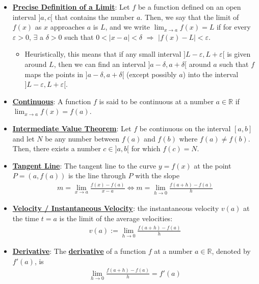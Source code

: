\documentclass[11pt]{article}
\newcommand{\dfn}[1]{\underline{\textbf{#1}}}
\newcommand{\R}[0]{\mathbb{R}}
\begin{document}
\begin{itemize}[noitemsep]
	\item \dfn{Precise Definition of a Limit}: Let $f$ be a function defined on an open interval $]a,c[$ that contains the number $a$. Then, we say that the limit of $f(x)$ as $x$ approaches $a$ is $L$, and we write $\lim_{x \rightarrow a} f(x) = L$ if for every $\varepsilon > 0$, $\exists$ a $\delta > 0$ such that $0 < | x - a | < \delta$ $\Rightarrow$ $|f(x) - L| < \varepsilon$.
	\begin{itemize}[noitemsep]	
		\item Heuristically, this means that if any small interval $] L - \varepsilon, L +  \varepsilon [$ is given around $L$, then we can find an interval $]a - \delta, a + \delta [$ around $a$ such that $f$ maps the points in $]a - \delta, a + \delta [$ (except possibly $a$) into the interval $] L - \varepsilon, L+ \varepsilon[$. 
	\end{itemize}
	\item \dfn{Continuous}: A function $f$ is said to be continuous at a number $ a \in \R$ if $\lim_{x \rightarrow a} f(x) = f(a)$. 
	\item \dfn{Intermediate Value Theorem}: Let $f$ be continuous on the interval $[a,b]$ and let $N$ be any number between $f(a)$ and $f(b)$ where $f(a) \neq f(b)$. Then, there exists a number $c \in ]a,b[$ for which $f(c) = N$. 
	\item \dfn{Tangent Line}: The tangent line to the curve $y = f(x)$ at the point $P = (a, f(a))$ is the line through $P$ with the slope 
	\begin{align}
		m = \lim_{x \rightarrow a} \frac{f(x) - f(a)}{x - a} \iff m = \lim_{h \rightarrow 0} \frac{f(a+h) - f(a)}{h}	
	\end{align}
	\item \dfn{Velocity / Instantaneous Velocity}: the instantaneous velocity $v(a)$ at the time $t=a$ is the limit of the average velocities: 
	\begin{align}
		v(a) := \lim_{h \rightarrow 0} \frac{f(a+h) - f(a)}{h}	
	\end{align}
	\item \dfn{Derivative}: The \dfn{derivative} of a function $f$ at a number $a \in \R$, denoted by $f'(a)$, is 
	\begin{align}
		\lim_{h \rightarrow 0} \frac{f(a+h) - f(a)}{h} = f'(a)	
	\end{align}
\end{itemize}
\end{document}
